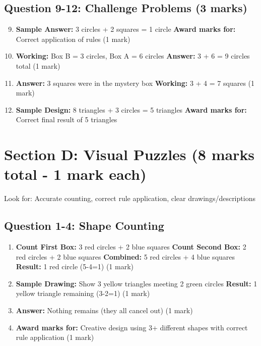 \documentclass{article}
\begin{document}
\subsection*{Question 9-12: Challenge Problems (3 marks)}
\begin{enumerate}
    \setcounter{enumi}{8}
    \item \textbf{Sample Answer:} 3 circles + 2 squares = 1 circle
          \textbf{Award marks for:} Correct application of rules (1 mark)
    
    \item \textbf{Working:} Box B = 3 circles, Box A = 6 circles
          \textbf{Answer:} 3 + 6 = 9 circles total (1 mark)
    
    \item \textbf{Answer:} 3 squares were in the mystery box
          \textbf{Working:} 3 + 4 = 7 squares (1 mark)
    
    \item \textbf{Sample Design:} 8 triangles + 3 circles = 5 triangles
          \textbf{Award marks for:} Correct final result of 5 triangles
\end{enumerate}

\section{Section D: Visual Puzzles (8 marks total - 1 mark each)}

\begin{tcolorbox}[colback=green!5,colframe=green!40,title=Visual Assessment Guide]
Look for: Accurate counting, correct rule application, clear drawings/descriptions
\end{tcolorbox}

\subsection*{Question 1-4: Shape Counting}
\begin{enumerate}
    \item \textbf{Count First Box:} 3 red circles + 2 blue squares
          \textbf{Count Second Box:} 2 red circles + 2 blue squares  
          \textbf{Combined:} 5 red circles + 4 blue squares
          \textbf{Result:} 1 red circle (5-4=1) (1 mark)
    
    \item \textbf{Sample Drawing:} Show 3 yellow triangles meeting 2 green circles
          \textbf{Result:} 1 yellow triangle remaining (3-2=1) (1 mark)
    
    \item \textbf{Answer:} Nothing remains (they all cancel out) (1 mark)
    
    \item \textbf{Award marks for:} Creative design using 3+ different shapes with correct rule application (1 mark)
\end{enumerate}
\end{document}
